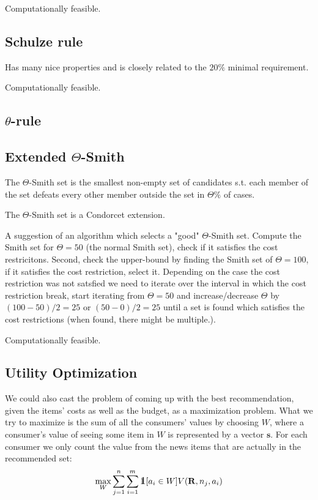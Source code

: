 \documentclass{article}
\def\one{\mbox{1\hspace{-4.25pt}\fontsize{12}{14.4}\selectfont\textrm{1}}} %
\begin{document}
Computationally feasible.\subsection{Schulze rule}

Has many nice properties and is closely related to the $20\%$ minimal requirement.

Computationally feasible.

\subsection{$\theta$-rule}

\subsection{Extended $\Theta$-Smith}

The $\Theta$-Smith set is the smallest non-empty set of candidates s.t. each member of the set defeats every other member outside
 the set in $\Theta \%$ of cases.

 The $\Theta$-Smith set is a Condorcet extension.

A suggestion of an algorithm which selects a "good" $\Theta$-Smith set. Compute the Smith set for $\Theta=50$
(the normal Smith set), check if it satisfies the cost restricitons. Second, check the upper-bound by finding the Smith
set of $\Theta=100$, if it satisfies the cost restriction, select it. Depending on the case the cost restriction was not
satsfied we need to iterate over the interval in which the cost restriction break, start iterating from $\Theta=50$ and
 increase/decrease $\Theta$ by $(100-50)/2=25$ or $(50-0)/2=25$ until a set is found which satisfies the cost
 restrictions (when found, there might be multiple.).

Computationally feasible.

\subsection{Utility Optimization}
We could also cast the problem of coming up with the best recommendation, 
given the items' costs as well as the budget, as a maximization problem. 
What we try to maximize is the sum of all the consumers' values by choosing $W$, 
where a consumer's value of seeing some item in $W$ is represented by a vector $\mathbf{s}$. 
For each consumer we only count the value from the news items that are actually in the recommended set:\\
\[
\max_W \sum_{j=1}^n \sum_{i=1}^m \one [a_i\in W] V(\mathbf{R}, n_j, a_i)
\]
\end{document}
